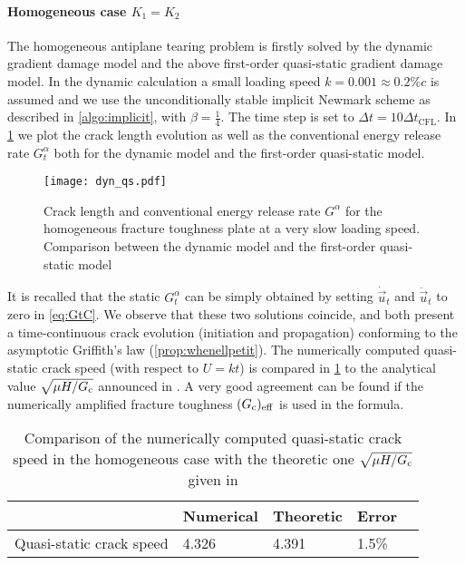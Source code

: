 \paragraph{Homogeneous case $K_1=K_2$} The homogeneous antiplane tearing problem is firstly solved by the dynamic gradient damage model and the above first-order quasi-static gradient damage model. In the dynamic calculation a small loading speed $k=0.001\approx 0.2\%c$ is assumed and we use the unconditionally stable implicit Newmark scheme as described in \cref{algo:implicit}, with $\beta=\frac{1}{4}$. The time step is set to $\Delta t=10\Delta t_\mathrm{CFL}$. In \cref{fig:homoGcqs} we plot the crack length evolution as well as the conventional energy release rate $G^\alpha_t$ both for the dynamic model and the first-order quasi-static model.
\begin{figure}[htbp]
\centering
\texttt{[image: dyn\_qs.pdf]}
\caption{Crack length and conventional energy release rate $G^\alpha$ for the homogeneous fracture toughness plate at a very slow loading speed. Comparison between the dynamic model and the first-order quasi-static model} \label{fig:homoGcqs}
\end{figure}
It is recalled that the static $G^\alpha_t$ can be simply obtained by setting $\dot{\vec{u}}_t$ and $\ddot{\vec{u}}_t$ to zero in \eqref{eq:GtC}. We observe that these two solutions coincide, and both present a time-continuous crack evolution (initiation and propagation) conforming to the asymptotic Griffith's law (\cref{prop:whenellpetit}). The numerically computed quasi-static crack speed (with respect to $U=kt$) is compared in \cref{tab:compqsv} to the analytical value $\sqrt{\mu H/G_\mathrm{c}}$ announced in \cite{BourdinFrancfortMarigo:2008}. A very good agreement can be found if the numerically amplified fracture toughness $(G_\mathrm{c})_\mathrm{eff}$ is used in the formula.
\begin{table}[htbp]
\centering
\caption{Comparison of the numerically computed quasi-static crack speed in the homogeneous case with the theoretic one $\sqrt{\mu H/G_\mathrm{c}}$ given in \cite{BourdinFrancfortMarigo:2008}} \label{tab:compqsv}
\begin{tabular}{lllll} \toprule
& Numerical & Theoretic & Error \\ \midrule
Quasi-static crack speed & 4.326 & 4.391 & 1.5\% \\ \bottomrule
\end{tabular}
\end{table}

